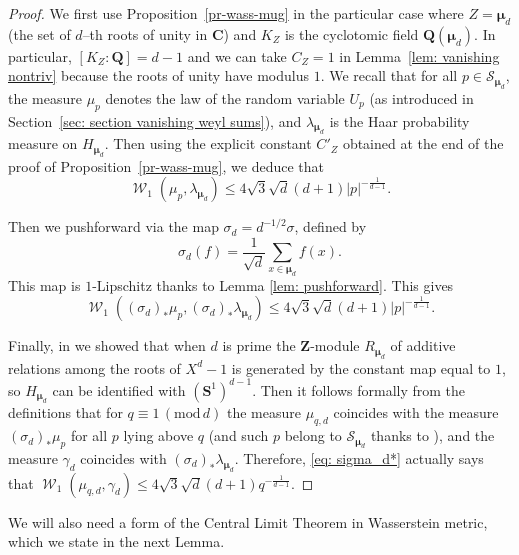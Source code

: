 \documentclass[12pt]{amsart}
\renewcommand{\mathcal}{\mathscr}
\newcommand{\Cc}{\mathbf{C}}
\newcommand{\Zz}{\mathbf{Z}}
\newcommand{\Ss}{\mathbf{S}}
\newcommand{\Qq}{\mathbf{Q}}
\newcommand{\mmu}{\boldsymbol{\mu}}
\newcommand{\mods}[1]{\,(\mathrm{mod}\,{#1})}
\DeclareMathOperator{\wass}{\mathcal{W}}
\theoremstyle{plain}
\theoremstyle{remark}
\theoremstyle{definition}
\newcommand{\mcS}{\mathcal{S}}
\begin{document}
\begin{proof}
  We first use Proposition~\ref{pr-wass-mug} in the particular case
  where $Z = \mmu_d$ (the set of $d$--th roots of
  unity in $\Cc$) and $K_Z$ is the cyclotomic field $\Qq(\mmu_d)$. In
  particular, $[K_Z: \Qq] = d-1$ and we can take $C_Z = 1$ in
  Lemma~\ref{lem: vanishing nontriv} because the roots of unity have
  modulus $1$. We recall that for all $p \in \mcS_{\mmu_d}$, the
  measure $\mu_p$ denotes the law of the random variable $U_p$ (as
  introduced in Section~\ref{sec: section vanishing weyl sums}), and
  $\lambda_{\mmu_d}$ is the Haar probability measure on $H_{\mmu_d}$. Then using the explicit constant $C'_Z$ obtained at the end
  of the proof of Proposition~\ref{pr-wass-mug}, we deduce that
  $$
  \wass_1(\mu_p, \lambda_{\mmu_d}) \leqslant 4 \sqrt{3} \sqrt{d} (d+1) |p|^{-\frac{1}{d-1}}.
  $$
  
  Then we pushforward via the map $\sigma_d=d^{-1/2}\sigma$, defined
  by
  \[
    \sigma_d(f)=\frac{1}{\sqrt{d}}\sum_{x\in \mmu_d}f(x).
  \]
  This map is
  $1$-Lipschitz thanks to Lemma \ref{lem: pushforward}. This gives
  \begin{equation} \label{eq: sigma_d*} \wass_1\left( \left(\sigma_d
      \right)_{*} \mu_p, \left(\sigma_d \right)_{*} \lambda_{\mmu_d}
    \right) \leqslant 4 \sqrt{3} \sqrt{d} (d+1) |p|^{-\frac{1}{d-1}}.
  \end{equation}

  Finally, in \cite[\S 3]{ultrashort} we showed that when
  $d$ is prime the $\Zz$-module
  $R_{\mmu_d}$ of additive relations among the roots of
  $X^d-1$ is generated by the constant map equal to $1$, so
  $H_{\mmu_d}$ can be identified with
  $(\Ss^1)^{d-1}$. Then it follows formally from the definitions that
  for $q \equiv 1 \mods{d}$ the measure
  $\mu_{q,d}$ coincides with the measure
  $(\sigma_d)_{*}\mu_p$ for all $p$ lying above $q$ (and such
  $p$ belong to
  $\mcS_{\mmu_d}$ thanks to \cite[Cor. 10.4]{neukirch}), and the measure
  $\gamma_d$ coincides with
  $(\sigma_d)_*\lambda_{\mmu_d}$. Therefore, \eqref{eq: sigma_d*}
  actually says that $ \wass_1(\mu_{q,d}, \gamma_d ) \leqslant 4
  \sqrt{3} \sqrt{d} (d+1) q^{-\frac{1}{d-1}}$.
\end{proof}

We will also need a form of the Central Limit Theorem in Wasserstein
metric, which we state in the next Lemma.
\end{document}
